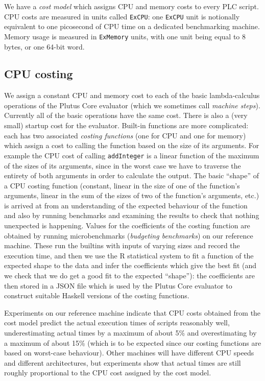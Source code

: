 \documentclass[a4paper]{article}
\begin{document}
We have a \textit{cost model} which assigns CPU and memory costs to every PLC
script.  CPU costs are measured in units called \texttt{ExCPU}: one
\texttt{ExCPU} unit is notionally equivalent to one picosecond of CPU time on a
dedicated benchmarking machine.  Memory usage is measured in \texttt{ExMemory}
units, with one unit being equal to 8 bytes, or one 64-bit word.


\subsection{CPU costing}  We assign a constant CPU and memory cost to each of
the basic lambda-calculus operations of the Plutus Core evaluator (which we
sometimes call \textit{machine steps}).  Currently all of the basic operations
have the same cost.  There is also a (very small) startup cost for the
evaluator.  Built-in functions are more complicated: each has two associated
\textit{costing functions} (one for CPU and one for memory) which assign a cost
to calling the function based on the size of its arguments.  For example the CPU
cost of calling \texttt{addInteger} is a linear function of the maximum of the
sizes of its arguments, since in the worst case we have to traverse the entirety
of both arguments in order to calculate the output. The basic ``shape'' of a CPU
costing function (constant, linear in the size of one of the function's
arguments, linear in the sum of the sizes of two of the function's arguments,
etc.) is arrived at from an understanding of the expected behaviour of the
function and also by running benchmarks and examining the results to check that
nothing unexpected is happening.  Values for the coefficients of the costing
function are obtained by running microbenchmarks (\textit{budgeting benchmarks})
on our reference machine.  These run the builtins with inputs of varying sizes
and record the execution time, and then we use the R statistical system to fit a
function of the expected shape to the data and infer the coefficients which give
the best fit (and we check that we do get a good fit to the expected ``shape''):
the coefficients are then stored in a JSON file which is used by the Plutus Core
evaluator to construct suitable Haskell versions of the costing functions.

Experiments on our reference machine indicate that CPU costs obtained from the
cost model predict the actual execution times of scripts reasonably well,
underestimating actual times by a maximum of about 5\% and overestimating by a
maximum of about 15\% (which is to be expected since our costing functions are
based on worst-case behaviour).  Other machines will have different CPU speeds
and different architectures, but experiments show that actual times are still
roughly proportional to the CPU cost assigned by the cost model.
\end{document}
